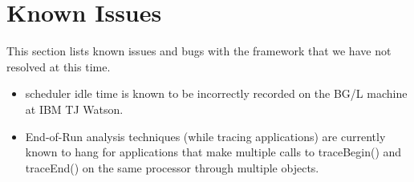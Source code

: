 \documentclass[10pt]{article}
\begin{document}
\section{Known Issues}
\label{sec::known issues}

This section lists known issues and bugs with the \projections{}
framework that we have not resolved at this time.

\begin{itemize}
\item
\charmpp{} scheduler idle time is known to be incorrectly recorded on
the BG/L machine at IBM TJ Watson.
\item
End-of-Run analysis techniques (while tracing applications) are
currently known to hang for applications that make multiple calls to
traceBegin() and traceEnd() on the same processor through multiple
\charmpp{} objects.
\end{itemize}
\end{document}
